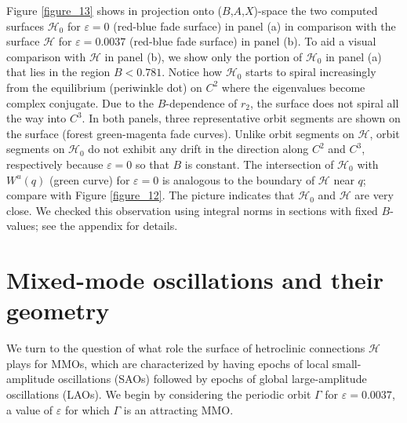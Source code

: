 \documentclass{ws-ijbc}
\begin{document}
Figure \ref{figure_13} shows in projection onto ($B$,$A$,$X$)-space the two computed surfaces $\mathscr{H}_0$ for $\varepsilon=0$ (red-blue fade surface) in panel (a) in comparison with the surface $\mathscr{H}$ for $\varepsilon=0.0037$ (red-blue fade surface) in panel (b).  To aid a visual comparison with $\mathscr{H}$ in panel (b), we show only the portion of $\mathscr{H}_0$ in panel (a) that lies in the region $B < 0.781$.  Notice how $\mathscr{H}_0$ starts to spiral increasingly from the equilibrium (periwinkle dot) on $C^2$ where the eigenvalues become complex conjugate.  Due to the $B$-dependence of $r_2$, the surface does not spiral all the way into $C^3$.  In both panels, three representative orbit segments are shown on the surface (forest green-magenta fade curves).  Unlike orbit segments on $\mathscr{H}$, orbit segments on $\mathscr{H}_0$ do not exhibit any drift in the direction along $C^2$ and $C^3$, respectively because $\varepsilon=0$ so that $B$ is constant.  The intersection of $\mathscr{H}_0$ with $W^u(q)$ (green curve) for $\varepsilon=0$ is analogous to the boundary of $\mathscr{H}$ near $q$; compare with Figure \ref{figure_12}.  The picture indicates that $\mathscr{H}_0$ and $\mathscr{H}$ are very close.  We checked this observation using integral norms in sections with fixed $B$-values; see the appendix for details.

\section{Mixed-mode oscillations and their geometry}

We turn to the question of what role the surface of hetroclinic connections $\mathscr{H}$ plays for MMOs, which are characterized by having epochs of local small-amplitude oscillations (SAOs) followed by epochs of global large-amplitude oscillations (LAOs).  We begin by considering the periodic orbit $\Gamma$ for $\varepsilon=0.0037$, a value of $\varepsilon$ for which $\Gamma$ is an attracting MMO.  
\end{document}
